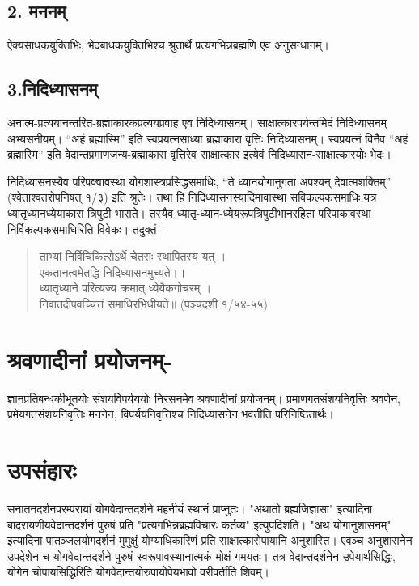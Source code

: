 \subsection*{2. मननम् }

ऐक्यसाधकयुक्तिभिः, भेदबाधकयुक्तिभिश्च श्रुतार्थे प्रत्यगभिन्नब्रह्मणि एव अनुसन्धानम्।

\subsection*{3.निदिध्यासनम् }

अनात्म-प्रत्ययानन्तरित-ब्रह्माकारकप्रत्ययप्रवाह एव निदिध्यासनम्। साक्षात्कारपर्यन्तमिदं निदिध्यासनम् अभ्यसनीयम्। “अहं ब्रह्मास्मि” इति स्वप्रयत्नसाध्या ब्रह्माकारा वृत्तिः निदिध्यासनम्। स्वप्रयत्नं विनैव “अहं ब्रह्मास्मि” इति वेदान्तप्रमाणजन्य-ब्रह्माकारा वृत्तिरेव साक्षात्कार इत्येवं निदिध्यासन-साक्षात्कारयोः भेदः।

निदिध्यासनस्यैव परिपक्वावस्था योगशास्त्रप्रसिद्धसमाधिः, “ते ध्यानयोगानुगता अपश्यन् देवात्मशक्तिम्” (श्वेताश्वतरोपनिषत् १/३) इति श्रुतेः। तथा हि निदिध्यासनस्यादिमावास्था सविकल्पकसमाधिः,यत्र ध्यातृध्यानध्येयाकारा त्रिपुटी भासते। तस्यैव ध्यातृ-ध्यान-ध्येयरूपत्रिपुटीभानरहिता परिपाकावस्था निर्विकल्पकसमाधिरिति विवेकः। तदुक्तं - 

\begin{verse}
ताभ्यां निर्विचिकित्सेऽर्थे चेतसः स्थापितस्य यत् । \\
एकतानत्वमेतद्धि निदिध्यासनमुच्यते।।\\
ध्यातृध्याने परित्यज्य क्रमात् ध्येयैकगोचरम् ।\\ 
निवातदीपवच्चित्तं समाधिरभिधीयते॥ (पञ्चदशी १/५४-५५)
\end{verse}

\section*{श्रवणादीनां प्रयोजनम्-}

ज्ञानप्रतिबन्धकीभूतयोः संशयविपर्यययोः निरसनमेव श्रवणादीनां प्रयोजनम्। प्रमाणगतसंशयनिवृत्तिः श्रवणेन, प्रमेयगतसंशयनिवृत्तिः मननेन, विपर्ययनिवृत्तिश्च निदिध्यासनेन भवतीति परिनिष्ठितार्थः।

\section*{उपसंहारः}

सनातनदर्शनपरम्परायां योगवेदान्तदर्शने महनीयं स्थानं प्राप्नुतः। "अथातो ब्रह्मजिज्ञासा" इत्यादिना बादरायणीयवेदान्तदर्शनं पुरुषं प्रति "प्रत्यगभिन्नब्रह्मविचारः कर्तव्य" इत्युपदिशति। "अथ योगानुशासनम्" इत्यादिना पातञ्जलयोगदर्शनं मुमुक्षुं योग्याधिकारिणं प्रति साक्षात्कारोपायानि अनुशास्ति। एवञ्च अनुशासनेन उपदेशेन च योगवेदान्तदर्शने पुरुषं स्वरूपावस्थानात्मकं मोक्षं गमयतः। तत्र वेदान्तदर्शनेन उपेयार्थसिद्धिः, योगेन चोपायसिद्धिरिति योगवेदान्तयोरुपायोपेयभावो वरीवर्तीति शिवम्।

\articleend
